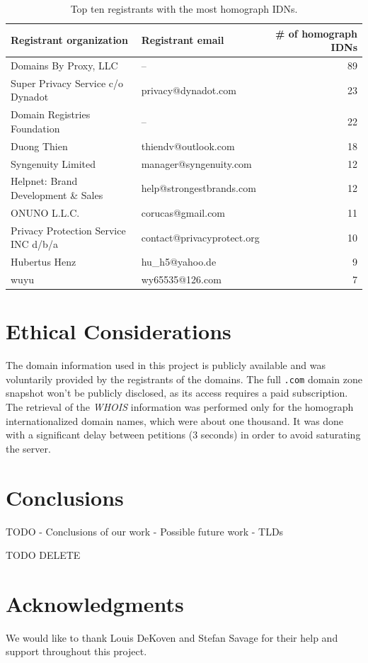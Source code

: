 \documentclass[letterpaper,twocolumn,10pt]{article}
\begin{document}
\begin{table}[ht!]
\centering
\begin{tabular}{llr}
\hline
Registrant organization              & Registrant email           & \# of homograph IDNs \\ \hline
Domains By Proxy, LLC                & --                         & 89                   \\
Super Privacy Service c/o Dynadot    & privacy@dynadot.com        & 23                   \\
Domain Registries Foundation         & --                         & 22                   \\
Duong Thien                          & thiendv@outlook.com        & 18                   \\
Syngenuity Limited                   & manager@syngenuity.com     & 12                   \\
Helpnet: Brand Development \& Sales  & help@strongestbrands.com   & 12                   \\
ONUNO L.L.C.                         & corucas@gmail.com          & 11                   \\
Privacy Protection Service INC d/b/a & contact@privacyprotect.org & 10                   \\
Hubertus Henz                        & hu\_h5@yahoo.de            & 9                    \\
wuyu                                 & wy65535@126.com            & 7                    \\ \hline
\end{tabular}
\caption{Top ten registrants with the most homograph IDNs.}
\label{top-registrants-homograph-idns}
\end{table}

\section{Ethical Considerations}
The domain information used in this project is publicly available and was voluntarily provided by the registrants of the domains.
The full \texttt{.com} domain zone snapshot won't be publicly disclosed, as its access requires a paid subscription.
The retrieval of the \textit{WHOIS} information was performed only for the homograph internationalized domain names, which were about one thousand.
It was done with a significant delay between petitions (3 seconds) in order to avoid saturating the server.

\section{Conclusions}
TODO
- Conclusions of our work
- Possible future work
- TLDs

TODO DELETE~\cite{ipv4sta}

\section*{Acknowledgments}
We would like to thank Louis DeKoven and Stefan Savage for their help and support throughout this project.

{\footnotesize 
}
\end{document}
